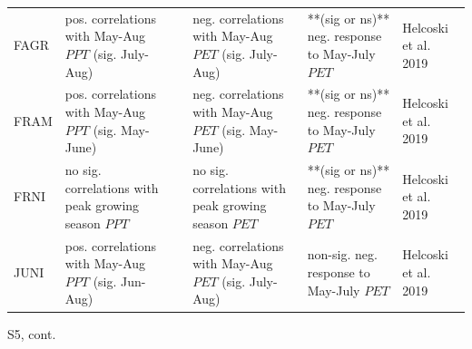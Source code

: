\documentclass[
]{article}
\begin{document}
\begin{longtable}{l>{\raggedright\arraybackslash}p{2.5cm}>{\raggedright\arraybackslash}p{2.5cm}>{\raggedright\arraybackslash}p{2.5cm}>{\raggedright\arraybackslash}p{2.5cm}>{\raggedright\arraybackslash}p{2cm}}
\hspace{1em}FAGR & pos. correlations with May-Aug $PPT$ (sig. July-Aug) &  & neg. correlations with May-Aug $PET$ (sig. July-Aug) & **(sig or ns)** neg. response to May-July $PET$ & Helcoski et al. 2019\\
\hspace{1em}FRAM & pos. correlations with May-Aug $PPT$ (sig. May-June) &  & neg. correlations with May-Aug $PET$ (sig. May-June) & **(sig or ns)** neg. response to May-July $PET$ & Helcoski et al. 2019\\
\hspace{1em}FRNI & no sig. correlations with peak growing season $PPT$ &  & no sig. correlations with peak growing season $PET$ & **(sig or ns)** neg. response to May-July $PET$ & Helcoski et al. 2019\\
\hspace{1em}JUNI & pos. correlations with May-Aug $PPT$ (sig. Jun-Aug) &  & neg. correlations with May-Aug $PET$ (sig. July-Aug) & non-sig. neg. response to May-July $PET$ & Helcoski et al. 2019\\
\bottomrule
\end{longtable}
\endgroup{}

\newpage

S5, cont. \begingroup\fontsize{7}{9}\selectfont
\end{document}
